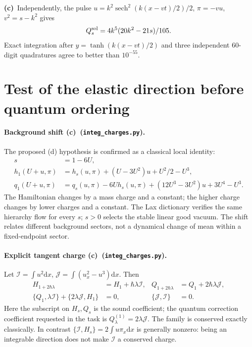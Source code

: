 \documentclass[11pt,a4paper]{article}
\newcommand{\C}{\textbf{(c)}\ }
\newcommand{\dd}{\mathrm d}
\newcommand{\file}[1]{\nolinkurl{#1}}
\newcommand{\chg}{\file{integ_charges.py}}
\newcommand{\I}{\mathcal I}
\newcommand{\J}{\mathcal J}
\begin{document}
\C Independently, the pulse
$u=k^2\operatorname{sech}^2(k(x-vt)/2)/2$, $\pi=-vu$, $v^2=s-k^2$ gives
\begin{equation}
 Q_s^{\rm sol}=4k^5(20k^2-21s)/105.
\end{equation}
Exact integration after $y=\tanh(k(x-vt)/2)$ and three independent
60-digit quadratures agree to better than $10^{-55}$.

\section{Test of the elastic direction before quantum ordering}
\paragraph{Background shift \C (\chg).}
The proposed (d) hypothesis is confirmed as a classical local identity:
\begin{align}
 s&=1-6U,\\
 h_1(U+u,\pi)&=h_s(u,\pi)+(U-3U^2)u+U^2/2-U^3,\\
 q_1(U+u,\pi)&=q_s(u,\pi)-6Uh_s(u,\pi)
 +(12U^3-3U^2)u+3U^4-U^3.\label{shift}
\end{align}
The Hamiltonian changes by a mass charge and a constant; the higher charge
changes by lower charges and a constant. The Lax dictionary verifies the
same hierarchy flow for every $s$; $s>0$ selects the stable linear good
vacuum. The shift relates different background sectors, not a dynamical
change of mean within a fixed-endpoint sector.

\paragraph{Explicit tangent charge \C (\chg).}
Let $\I=\int u^2\dd x$, $\J=\int(u_x^2-u^3)\dd x$. Then
\begin{align}
 H_{1+2\hbar\lambda}&=H_1+\hbar\lambda\I,&
 Q_{1+2\hbar\lambda}&=Q_1+2\hbar\lambda\J,\\
 \{Q_1,\lambda\I\}+\{2\lambda\J,H_1\}&=0,&\{\J,\I\}&=0.\label{tangent}
\end{align}
Here the subscript on $H_s,Q_s$ is the sound coefficient; the quantum
correction coefficient requested in the task is
$Q^{(1)}_\lambda=2\lambda\J$.
The family is conserved exactly classically.
In contrast $\{\I,H_s\}=2\int u\pi_x\dd x$ is generally nonzero:
being an integrable direction does not make $\I$ a conserved charge.
\end{document}
